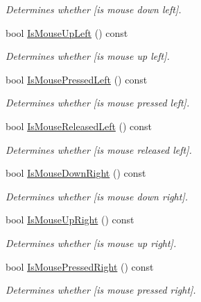 \begin{DoxyCompactItemize}
\begin{DoxyCompactList}\small\item\em Determines whether \mbox{[}is mouse down left\mbox{]}. \end{DoxyCompactList}\item 
bool \hyperlink{class_input_manager_a9b2f41752e74cac3dd26b3e289c0d1e2}{Is\+Mouse\+Up\+Left} () const 
\begin{DoxyCompactList}\small\item\em Determines whether \mbox{[}is mouse up left\mbox{]}. \end{DoxyCompactList}\item 
bool \hyperlink{class_input_manager_ac5336f30037da9913a0da969841af8af}{Is\+Mouse\+Pressed\+Left} () const 
\begin{DoxyCompactList}\small\item\em Determines whether \mbox{[}is mouse pressed left\mbox{]}. \end{DoxyCompactList}\item 
bool \hyperlink{class_input_manager_a9a29ed43728778bc13ddf57b1542f81c}{Is\+Mouse\+Released\+Left} () const 
\begin{DoxyCompactList}\small\item\em Determines whether \mbox{[}is mouse released left\mbox{]}. \end{DoxyCompactList}\item 
bool \hyperlink{class_input_manager_a8e473bfc51f360c6fa47c485aa3a6f60}{Is\+Mouse\+Down\+Right} () const 
\begin{DoxyCompactList}\small\item\em Determines whether \mbox{[}is mouse down right\mbox{]}. \end{DoxyCompactList}\item 
bool \hyperlink{class_input_manager_a287b246f096f95f3a31676388e1216f8}{Is\+Mouse\+Up\+Right} () const 
\begin{DoxyCompactList}\small\item\em Determines whether \mbox{[}is mouse up right\mbox{]}. \end{DoxyCompactList}\item 
bool \hyperlink{class_input_manager_a79bd1a1e2ccbfb61e596c9211e3e85bc}{Is\+Mouse\+Pressed\+Right} () const 
\begin{DoxyCompactList}\small\item\em Determines whether \mbox{[}is mouse pressed right\mbox{]}. \end{DoxyCompactList}\item 

\end{DoxyCompactItemize}
